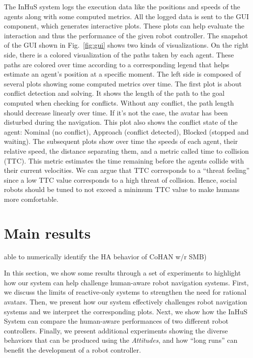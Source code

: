 The InHuS system logs the execution data like the positions and speeds of the agents along with some computed metrics. All the logged data is sent to the GUI component, which generates interactive plots. These plots can help evaluate the interaction and thus the performance of the given robot controller. The snapshot of the GUI shown in Fig.~\ref{fig:gui} shows two kinds of visualizations. On the right side, there is a colored visualization of the paths taken by each agent. These paths are colored over time according to a corresponding legend that helps estimate an agent's position at a specific moment. The left side is composed of several plots showing some computed metrics over time. The first plot is about conflict detection and solving. It shows the length of the path to the goal computed when checking for conflicts. Without any conflict, the path length should decrease linearly over time. If it's not the case, the avatar has been disturbed during the navigation. This plot also shows the conflict state of the agent: Nominal (no conflict), Approach (conflict detected), Blocked (stopped and waiting). The subsequent plots show over time the speeds of each agent, their relative speed, the distance separating them, 
and a metric called time to collision (TTC). This metric estimates the time remaining before the agents collide with their current velocities. We can argue that TTC corresponds to a ``threat feeling'' since a low TTC value corresponds to a high threat of collision. Hence, social robots should be tuned to not exceed a minimum TTC value to make humans more comfortable.

\section{Main results}
able to numerically identify the HA behavior of CoHAN w/r SMB)


In this section, we show some results through a set of experiments to highlight how our system can help challenge human-aware robot navigation systems. First, we discuss the limits of reactive-only systems to strengthen the need for rational avatars. 
Then, we present how our system effectively challenges robot navigation systems and we interpret the corresponding plots.
Next, we show how the InHuS System can compare the human-aware performances of two different robot controllers.
Finally, we present additional experiments showing the diverse behaviors that can be produced using the \textit{Attitudes}, and how ``long runs'' can benefit the development of a robot controller.

